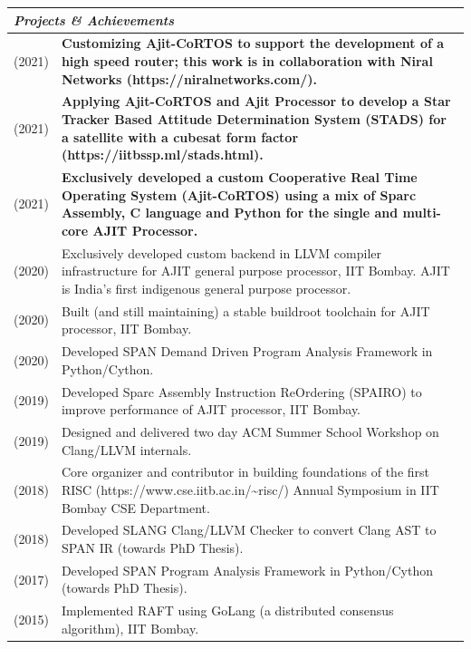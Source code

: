 \documentclass[a4paper,12pt]{article}
\newcommand{\Heading}[1]{\textbf{\itshape\normalsize #1}}
\begin{document}
\begin{flushleft}
\vspace{1em}
\begin{tabular}{ m{} m{}}
\multicolumn{2}{l}{\Heading{Projects \& Achievements}} \\
    \hline
    \hline
\rule[13pt]{0ex}{0ex}(2021) & \textbf{Customizing Ajit-CoRTOS to support the development of a high speed router; this work is in collaboration with Niral Networks (https://niralnetworks.com/).}\\
\rule[13pt]{0ex}{0ex}(2021) & \textbf{Applying Ajit-CoRTOS and Ajit Processor to develop a Star Tracker Based Attitude Determination System (STADS) for a satellite with a cubesat form factor (https://iitbssp.ml/stads.html).}\\
\rule[13pt]{0ex}{0ex}(2021) & \textbf{Exclusively developed a custom Cooperative Real Time Operating System (Ajit-CoRTOS) using a mix of Sparc Assembly, C language and Python for the single and multi-core AJIT Processor.}\\
\rule[13pt]{0ex}{0ex}(2020) & Exclusively developed custom backend in LLVM compiler infrastructure
for AJIT general purpose processor, IIT Bombay. AJIT is India's first indigenous general purpose processor. \\
\rule[13pt]{0ex}{0ex}(2020) & Built (and still maintaining) a stable buildroot toolchain
for AJIT processor, IIT Bombay. \\
\rule[13pt]{0ex}{0ex}(2020) & Developed SPAN Demand Driven Program Analysis Framework in Python/Cython. \\
\rule[13pt]{0ex}{0ex}(2019) & Developed Sparc Assembly Instruction ReOrdering (SPAIRO)
to improve performance of AJIT processor, IIT Bombay. \\
\rule[13pt]{0ex}{0ex}(2019) & Designed and delivered two day ACM Summer School Workshop on Clang/LLVM internals.\\
\rule[13pt]{0ex}{0ex}(2018) & Core organizer and contributor in building foundations of the first RISC (https://www.cse.iitb.ac.in/\textasciitilde{}risc/) Annual Symposium in IIT Bombay CSE Department. \\
\rule[13pt]{0ex}{0ex}(2018) & Developed SLANG Clang/LLVM Checker to convert Clang AST to SPAN IR (towards PhD Thesis). \\
\rule[13pt]{0ex}{0ex}(2017) & Developed SPAN Program Analysis Framework in Python/Cython (towards PhD Thesis). \\
\rule[13pt]{0ex}{0ex}(2015) & Implemented RAFT using GoLang (a distributed consensus algorithm), IIT Bombay. \\

\end{tabular}
\end{flushleft}
\end{document}
